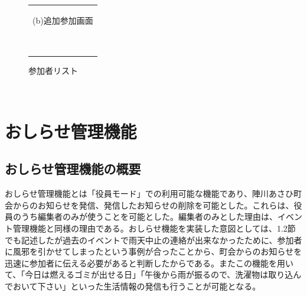 \begin{figure}[htbp]
\begin{center}
\begin{tabular}{c}
\begin{minipage}{0.33\hsize}
\begin{center}
          \hspace{1cm}%
          {\footnotesize (b)追加参加画面}
        \end{center}
      \end{minipage}
​
    \end{tabular}
    \caption{参加者リスト}
    \label{fig:lena}
  \end{center}
\end{figure}
​
\section{おしらせ管理機能}%
\subsection{おしらせ管理機能の概要}%
おしらせ管理機能とは「役員モード」での利用可能な機能であり、陣川あさひ町会からのお知らせを発信、発信したお知らせの削除を可能とした。これらは、役員のうち編集者のみが使うことを可能とした。編集者のみとした理由は、イベント管理機能と同様の理由である。おしらせ機能を実装した意図としては、1.2節でも記述したが過去のイベントで雨天中止の連絡が出来なかったために、参加者に風邪を引かせてしまったという事例が合ったことから、町会からのお知らせを迅速に参加者に伝える必要があると判断したからである。またこの機能を用いて、「今日は燃えるゴミが出せる日」「午後から雨が振るので、洗濯物は取り込んでおいて下さい」といった生活情報の発信も行うことが可能となる。
​
​
